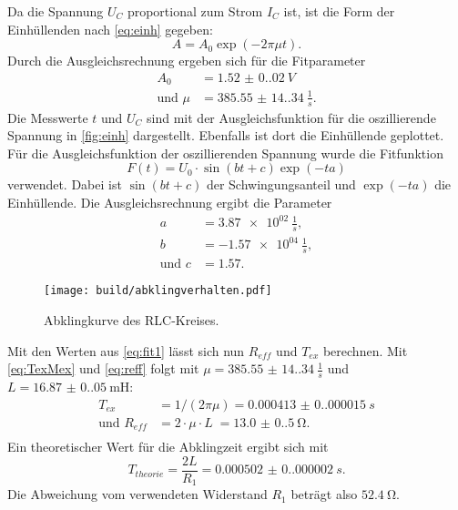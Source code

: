 Da die Spannung $U_C$ proportional zum Strom $I_C$ ist, ist die Form der Einhüllenden nach \autoref{eq:einh} gegeben:
\begin{equation*}
  A = A_0 \exp(-2 \pi \mu t).
\end{equation*}
Durch die Ausgleichsrechnung ergeben sich für die Fitparameter
\begin{align}
  A_0 &= \SI{1.52(0.02)}{V} \\
  \text{und } \mu &= \SI{385.55(14.34)}{\frac{1}{s}}.
  \label{eq:fit1}
\end{align}
Die Messwerte $t$ und $U_C$ sind mit der Ausgleichsfunktion für die oszillierende Spannung in \autoref{fig:einh} dargestellt. Ebenfalls ist dort die Einhüllende
geplottet.
Für die Ausgleichsfunktion der oszillierenden Spannung wurde die Fitfunktion
\begin{equation*}
  F(t) = U_0 \cdot \sin(bt+c) \exp(-ta)
\end{equation*}
verwendet. Dabei ist $\sin(bt+c)$ der Schwingungsanteil und $\exp(-ta)$ die Einhüllende. 
Die Ausgleichsrechnung ergibt die Parameter
\begin{align*}
  a &= \SI{3.87e02}{\frac{1}{s}},\\
  b &= \SI{-1.57e04}{\frac{1}{s}},\\
  \text{und } c &= \SI{1.57}.
\end{align*}
\begin{figure}[H]
  \texttt{[image: build/abklingverhalten.pdf]}
  \caption{Abklingkurve des RLC-Kreises.}
  \label{fig:einh}
\end{figure}
Mit den Werten aus \autoref{eq:fit1} lässt sich nun $R_{eff}$ und $T_{ex}$ berechnen. Mit \autoref{eq:TexMex} und \autoref{eq:reff} folgt mit 
$\mu = \SI{385.55(14.34)}{\frac{1}{s}}$ und $L = \SI{16.87(0.05)}{\milli\henry}$:
\begin{align*}
  T_{ex} &= 1/(2\pi\mu)                      = \SI{0.000413(0.000015)}{s}\\
  \text{und } R_{eff} &= 2 \cdot \mu \cdot L \; = \SI{13.0(0.5)}{\ohm}.\\
\end{align*}
Ein theoretischer Wert für die Abklingzeit ergibt sich mit 
\begin{equation*}
  T_{theorie} = \frac{2L}{R_1} = \SI{0.000502(0.000002)}{s}.
\end{equation*}
Die Abweichung vom verwendeten Widerstand $R_1$ beträgt also $\SI{52.4}{\ohm}$.


